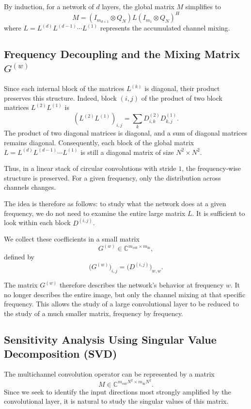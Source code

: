By induction, for a network of $d$ layers, the global matrix $M$ simplifies to
\[
M = (I_{m_{d+1}} \otimes Q_N) L (I_{m_1} \otimes Q_N)^H
\]
where $L = L^{(d)} L^{(d-1)} \cdots L^{(1)}$ represents the accumulated channel mixing.

\subsection{Frequency Decoupling and the Mixing Matrix $G^{(w)}$}

Since each internal block of the matrices $L^{(k)}$ is diagonal, their product preserves this structure.
Indeed, block $(i,j)$ of the product of two block matrices $L^{(2)}L^{(1)}$ is
\[
(L^{(2)}L^{(1)})_{i,j}
=
\sum_k D^{(2)}_{i,k}D^{(1)}_{k,j}.
\] 
The product of two diagonal matrices is diagonal, and a sum of diagonal matrices remains diagonal.
Consequently, each block of the global matrix $L = L^{(d)}L^{(d-1)}\cdots L^{(1)}$ is still a diagonal matrix of size $N^2 \times N^2$.

Thus, in a linear stack of circular convolutions with stride $1$, the frequency-wise structure
is preserved. For a given frequency, only the distribution across channels changes.

The idea is therefore as follows: to study what the network does at a given frequency, we do not
need to examine the entire large matrix $L$. It is sufficient to look within each block
$D^{(i,j)}$.

We collect these coefficients in a small matrix
\[
    G^{(w)} \in \mathbb{C}^{m_{\mathrm{out}}\times m_{\mathrm{in}}},
\]
defined by
\begin{equation}
    \bigl(G^{(w)}\bigr)_{i,j}
    =
    \bigl(D^{(i,j)}\bigr)_{w,w}.
    \label{eq:def_matrice_frequence}
\end{equation}

The matrix $G^{(w)}$ therefore describes the network's behavior at frequency $w$. It no longer describes
the entire image, but only the channel mixing at that specific frequency. This
allows the study of a large convolutional layer to be reduced to the study of a much
smaller matrix, frequency by frequency.

\subsection{Sensitivity Analysis Using Singular Value Decomposition (SVD)}

The multichannel convolution operator can be represented by a matrix
\[
    M \in \mathbb{C}^{m_{\mathrm{out}}N^2 \times m_{\mathrm{in}}N^2}.
\]
Since we seek to identify the input directions most strongly amplified by the convolutional
layer, it is natural to study the singular values of this matrix.

